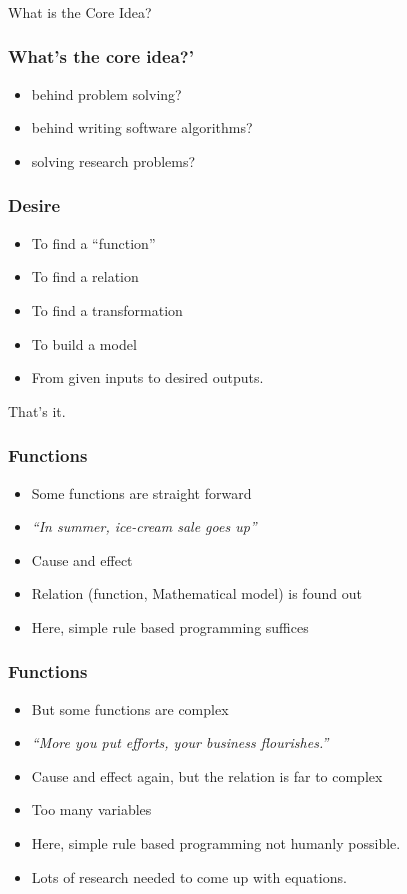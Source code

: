 \begin{frame}[fragile]\frametitle{}
\begin{center}
{\Large What is the Core Idea?}
\end{center}
\end{frame}

\begin{frame}[fragile]\frametitle{What's the core idea?'}
\begin{itemize}
\item behind problem solving?
\item behind writing software algorithms?
\item solving research problems?
\end{itemize}
\end{frame}

\begin{frame}[fragile]\frametitle{Desire}
\begin{itemize}
\item To find a ``function''
\item To find a relation
\item To find a transformation
\item To build a model
\item From given inputs to desired outputs.
\end{itemize}
That's it.
\end{frame}

\begin{frame}[fragile]\frametitle{Functions}
\begin{itemize}
\item Some functions are straight forward
\item {\em ``In summer, ice-cream sale goes up''}
\item Cause and effect
\item Relation (function, Mathematical model) is found out
\item Here, simple rule based programming suffices
\end{itemize}
\end{frame}

\begin{frame}[fragile]\frametitle{Functions}
\begin{itemize}
\item But some functions are complex
\item {\em ``More you put efforts, your business flourishes.''}
\item Cause and effect again, but the relation is far to complex
\item Too many variables
\item Here, simple rule based programming not humanly possible.
\item Lots of research needed to come up with equations.
\end{itemize}
\end{frame}

